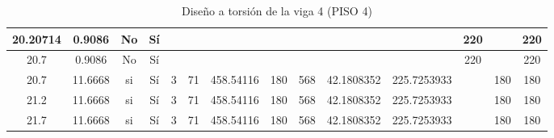 \begin{table}[H]
{\begin{tabular}{|c|c|c|c|c|c|c|c|c|c|c|c|c|c|}
\hline
20.20714 & 0.9086 & No  & Sí  &     &     &     &     &     &     &     & 220 &     & 220 \bigstrut\\
\hline
20.7 & 0.9086 & No  & Sí  &     &     &     &     &     &     &     & 220 &     & 220 \bigstrut\\
\hline
20.7 & 11.6668 & si  & Sí  & 3   & 71  & 458.54116 & 180 & 568 & 42.1808352 & 225.7253933 &     & 180 & 180 \bigstrut\\
\hline
21.2 & 11.6668 & si  & Sí  & 3   & 71  & 458.54116 & 180 & 568 & 42.1808352 & 225.7253933 &     & 180 & 180 \bigstrut\\
\hline
21.7 & 11.6668 & si  & Sí  & 3   & 71  & 458.54116 & 180 & 568 & 42.1808352 & 225.7253933 &     & 180 & 180 \bigstrut\\
\hline
\end{tabular}%

  


  }
      \caption{Diseño a torsión de la viga 4 (PISO 4) }
  \label{tab:T VG4 P4 }%
\end{table}%
